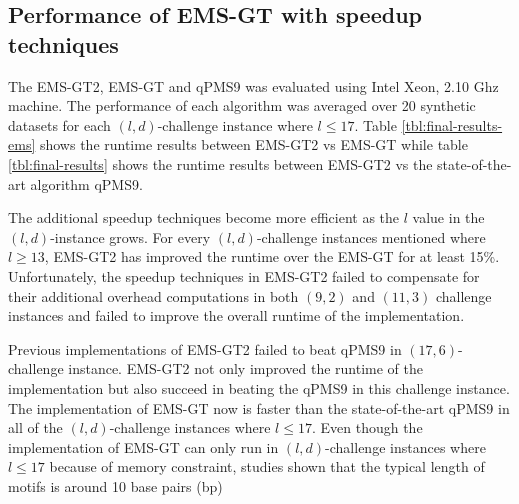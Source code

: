 \subsection{Performance of EMS-GT with speedup techniques}

The EMS-GT2, EMS-GT and qPMS9 was evaluated using Intel Xeon, 2.10 Ghz machine. The performance of each algorithm was averaged over 20 synthetic datasets for each $(l, d)$-challenge instance where $l \leq 17$. Table \ref{tbl:final-results-ems} shows the runtime results between EMS-GT2 vs EMS-GT while table \ref{tbl:final-results} shows the runtime results between EMS-GT2 vs the state-of-the-art algorithm qPMS9.


The additional speedup techniques become more efficient as the $l$ value in the $(l, d)$-instance grows. For every $(l, d)$-challenge instances mentioned where $l \geq 13$, EMS-GT2 has improved the runtime over the EMS-GT for at least 15\%. Unfortunately, the speedup techniques in EMS-GT2 failed to compensate for their additional overhead computations in both $(9, 2)$ and $(11, 3)$ challenge instances and failed to improve the overall runtime of the implementation.


Previous implementations of EMS-GT2 failed to beat qPMS9 in $(17, 6)$-challenge instance. EMS-GT2 not only improved the runtime of the implementation but also succeed in beating the qPMS9 in this challenge instance. The implementation of EMS-GT now is faster than the state-of-the-art qPMS9 in all of the $(l, d)$-challenge instances where $l \leq 17$. Even though the implementation of EMS-GT can only run in $(l, d)$-challenge instances where $l \leq 17$ because of memory constraint, studies shown that the typical length of motifs is around 10 base pairs (bp) \cite{stewart2012transcription}





